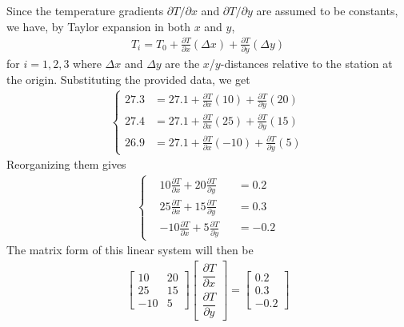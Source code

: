 \begin{solution}
Since the temperature gradients $\partial T/\partial x$ and $\partial T/\partial y$ are assumed to be constants, we have, by Taylor expansion in both $x$ and $y$,
\begin{align*}
T_i = T_0 + \frac{\partial T}{\partial x}(\Delta x) + \frac{\partial T}{\partial y}(\Delta y)
\end{align*}
for $i = 1,2,3$ where $\Delta x$ and $\Delta y$ are the $x$/$y$-distances relative to the station at the origin. Substituting the provided data, we get
\begin{align*}
\left\{\begin{alignedat}{2}
27.3 &= 27.1 + \frac{\partial T}{\partial x}(10) + \frac{\partial T}{\partial y}(20) \\ 
27.4 &= 27.1 + \frac{\partial T}{\partial x}(25) + \frac{\partial T}{\partial y}(15) \\
26.9 &= 27.1 + \frac{\partial T}{\partial x}(-10) + \frac{\partial T}{\partial y}(5) 
\end{alignedat}\right.
\end{align*}
Reorganizing them gives
\begin{align*}
\left\{\begin{alignedat}{2}
& 10\frac{\partial T}{\partial x} + 20\frac{\partial T}{\partial y}& &= 0.2 \\ 
& 25\frac{\partial T}{\partial x} + 15\frac{\partial T}{\partial y}& &= 0.3 \\
& {-}10\frac{\partial T}{\partial x} + 5\frac{\partial T}{\partial y}& &= -0.2
\end{alignedat}\right.
\end{align*}
The matrix form of this linear system will then be
\begin{align*}
\begin{bmatrix}
10 & 20 \\
25 & 15 \\
-10 & 5
\end{bmatrix}
\begin{bmatrix}
\dfrac{\partial T}{\partial x} \\[10pt]
\dfrac{\partial T}{\partial y} 
\end{bmatrix}
=
\begin{bmatrix}
0.2 \\
0.3 \\
-0.2
\end{bmatrix}
\end{align*}
\end{solution}

